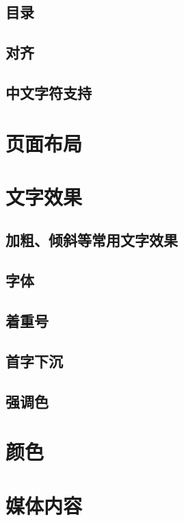 \documentclass[cn,10pt,math=newtx,citestyle=gb7714-2015,bibstyle=gb7714-2015]{elegantbook}
\begin{document}
    \subsection {目录}

    \subsection {对齐}

    \subsection {中文字符支持}

    \section {页面布局}

    \section {文字效果}

    \subsection {加粗、倾斜等常用文字效果}

    \subsection {字体}

    \subsection {着重号}

    \subsection {首字下沉}

    \subsection {强调色}

    \section {颜色}

    \section {媒体内容}
    
\end{document}

